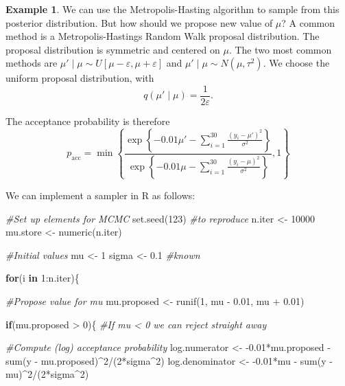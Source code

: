 \documentclass[
]{book}
\newenvironment{Shaded}{\begin{snugshade}}{\end{snugshade}}
\newcommand{\CommentTok}[1]{\textcolor[rgb]{0.56,0.35,0.01}{\textit{#1}}}
\newcommand{\ControlFlowTok}[1]{\textcolor[rgb]{0.13,0.29,0.53}{\textbf{#1}}}
\newcommand{\DecValTok}[1]{\textcolor[rgb]{0.00,0.00,0.81}{#1}}
\newcommand{\FloatTok}[1]{\textcolor[rgb]{0.00,0.00,0.81}{#1}}
\newcommand{\FunctionTok}[1]{\textcolor[rgb]{0.00,0.00,0.00}{#1}}
\newcommand{\NormalTok}[1]{#1}
\newcommand{\OtherTok}[1]{\textcolor[rgb]{0.56,0.35,0.01}{#1}}
\newcommand{\SpecialCharTok}[1]{\textcolor[rgb]{0.00,0.00,0.00}{#1}}
\theoremstyle{definition}
\theoremstyle{definition}
\newtheorem{example}{Example}[chapter]
\theoremstyle{definition}
\theoremstyle{definition}
\theoremstyle{remark}
\begin{document}
\begin{example}
We can use the Metropolis-Hasting algorithm to sample from this posterior distribution. But how should we propose new value of \(\mu\)? A common method is a Metropolis-Hastings Random Walk proposal distribution. The proposal distribution is symmetric and centered on \(\mu\). The two most common methods are \(\mu' \mid \mu \sim U[\mu - \varepsilon, \mu + \varepsilon]\) and \(\mu' \mid \mu \sim N(\mu, \tau^2)\). We choose the uniform proposal distribution, with
\[
q(\mu' \mid \mu) = \frac{1}{2\varepsilon}.
\]

The acceptance probability is therefore
\[
p_\textrm{acc} = \min\left\{\frac{\exp\left\{-0.01\mu' -\sum_{i=1}^{30}\frac{(y_i - \mu')^2}{\sigma^2}\right\} }{\exp\left\{-0.01\mu -\sum_{i=1}^{30}\frac{(y_i - \mu)^2}{\sigma^2}\right\} }, 1\right\}
\]

We can implement a sampler in R as follows:

\begin{Shaded}
\begin{Highlighting}[]
\CommentTok{\#Set up elements for MCMC}
\FunctionTok{set.seed}\NormalTok{(}\DecValTok{123}\NormalTok{) }\CommentTok{\#to reproduce}
\NormalTok{n.iter   }\OtherTok{\textless{}{-}} \DecValTok{10000}
\NormalTok{mu.store }\OtherTok{\textless{}{-}} \FunctionTok{numeric}\NormalTok{(n.iter)}

\CommentTok{\#Initial values}
\NormalTok{mu }\OtherTok{\textless{}{-}} \DecValTok{1} 
\NormalTok{sigma }\OtherTok{\textless{}{-}} \FloatTok{0.1} \CommentTok{\#known}

\ControlFlowTok{for}\NormalTok{(i }\ControlFlowTok{in} \DecValTok{1}\SpecialCharTok{:}\NormalTok{n.iter)\{}
  
  \CommentTok{\#Propose value for mu}
\NormalTok{  mu.proposed }\OtherTok{\textless{}{-}} \FunctionTok{runif}\NormalTok{(}\DecValTok{1}\NormalTok{, mu }\SpecialCharTok{{-}} \FloatTok{0.01}\NormalTok{, mu }\SpecialCharTok{+} \FloatTok{0.01}\NormalTok{)}
  
  \ControlFlowTok{if}\NormalTok{(mu.proposed }\SpecialCharTok{\textgreater{}} \DecValTok{0}\NormalTok{)\{ }\CommentTok{\#If mu \textless{} 0 we can reject straight away}
    
    \CommentTok{\#Compute (log) acceptance probability}
\NormalTok{    log.numerator   }\OtherTok{\textless{}{-}} \SpecialCharTok{{-}}\FloatTok{0.01}\SpecialCharTok{*}\NormalTok{mu.proposed }\SpecialCharTok{{-}} \FunctionTok{sum}\NormalTok{(y }\SpecialCharTok{{-}}\NormalTok{ mu.proposed)}\SpecialCharTok{\^{}}\DecValTok{2}\SpecialCharTok{/}\NormalTok{(}\DecValTok{2}\SpecialCharTok{*}\NormalTok{sigma}\SpecialCharTok{\^{}}\DecValTok{2}\NormalTok{)}
\NormalTok{    log.denominator }\OtherTok{\textless{}{-}} \SpecialCharTok{{-}}\FloatTok{0.01}\SpecialCharTok{*}\NormalTok{mu }\SpecialCharTok{{-}} \FunctionTok{sum}\NormalTok{(y }\SpecialCharTok{{-}}\NormalTok{ mu)}\SpecialCharTok{\^{}}\DecValTok{2}\SpecialCharTok{/}\NormalTok{(}\DecValTok{2}\SpecialCharTok{*}\NormalTok{sigma}\SpecialCharTok{\^{}}\DecValTok{2}\NormalTok{)}
    

\end{Highlighting}
\end{Shaded}
\end{example}
\end{document}
